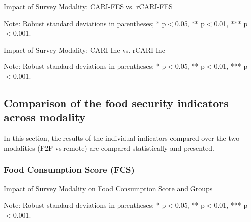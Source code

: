 \documentclass[11pt,harvard]{article}
\begin{document}
	
	\begin{table}[htbp]
		\centering
		\begin{adjustbox}{max width=\textwidth}
			\begin{threeparttable}
				\caption{Impact of Survey Modality: CARI-FES vs. rCARI-FES}
				\scriptsize
				 
				\label{tab:CARI_FES_rCARI_Modality_BF}
				\begin{tablenotes}
					\item Note: Robust standard deviations in parentheses; * p$<$0.05, ** p$<$0.01, *** p$<$0.001. 
				\end{tablenotes}
			\end{threeparttable}
		\end{adjustbox}
	\end{table}
	
	\begin{table}[htbp]
		\centering
		\begin{adjustbox}{max width=\textwidth}
			\begin{threeparttable}
				\caption{Impact of Survey Modality: CARI-Inc vs. rCARI-Inc}
				\scriptsize
				 
				\label{tab:Inc_CARI_rCARI_Modality_BF}
				\begin{tablenotes}
					\item Note: Robust standard deviations in parentheses; * p$<$0.05, ** p$<$0.01, *** p$<$0.001. 
				\end{tablenotes}
			\end{threeparttable}
		\end{adjustbox}
	\end{table}
	
	
	\subsection{Comparison of the food security indicators across modality} 
	In this section, the results of the individual indicators compared over the two modalities (F2F vs remote) are compared statistically and presented.
	
	\subsubsection{Food Consumption Score (FCS)}
	
	\begin{table}[htbp]
		\centering
		\begin{adjustbox}{max width=\textwidth}
			\begin{threeparttable}
				\caption{Impact of Survey Modality on Food Consumption Score and Groups}
				\scriptsize
				 
				\label{tab:FCS_Modality_BF}
				\begin{tablenotes}
					\item Note: Robust standard deviations in parentheses; * p$<$0.05, ** p$<$0.01, *** p$<$0.001.
				\end{tablenotes}
			\end{threeparttable}
		\end{adjustbox}
	\end{table}
	
\end{document}
